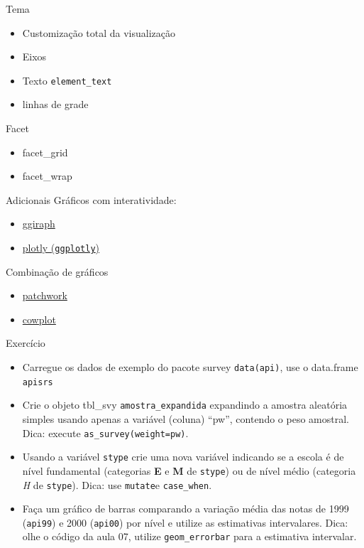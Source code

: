 \documentclass[
  9pt,
  ignorenonframetext,
]{beamer}
\begin{document}
\begin{frame}[fragile]{Tema}
\protect\hypertarget{tema}{}
\begin{itemize}
\item
  Customização total da visualização
\item
  Eixos
\item
  Texto \texttt{element\_text}
\item
  linhas de grade
\end{itemize}
\end{frame}

\begin{frame}{Facet}
\protect\hypertarget{facet}{}
\begin{itemize}
\item
  facet\_grid
\item
  facet\_wrap
\end{itemize}
\end{frame}

\begin{frame}[fragile]{Adicionais}
\protect\hypertarget{adicionais}{}
Gráficos com interatividade:

\begin{itemize}
\item
  \href{}{ggiraph}
\item
  \href{https://plotly-r.com/index.html}{plotly (\texttt{ggplotly})}
\end{itemize}

Combinação de gráficos

\begin{itemize}
\item
  \href{https://patchwork.data-imaginist.com/articles/patchwork.html}{patchwork}
\item
  \href{}{cowplot}
\end{itemize}
\end{frame}

\begin{frame}[fragile]{Exercício}
\protect\hypertarget{exercuxedcio}{}
\begin{itemize}
\item
  Carregue os dados de exemplo do pacote survey \texttt{data(api)}, use
  o data.frame \texttt{apisrs}
\item
  Crie o objeto tbl\_svy \texttt{amostra\_expandida} expandindo a
  amostra aleatória simples usando apenas a variável (coluna) ``pw'',
  contendo o peso amostral. Dica: execute
  \texttt{as\_survey(weight=pw)}.
\item
  Usando a variável \texttt{stype} crie uma nova variável indicando se a
  escola é de nível fundamental (categorias \textbf{E} e \textbf{M} de
  \texttt{stype}) ou de nível médio (categoria \emph{H} de
  \texttt{stype}). Dica: use \texttt{mutate}e \texttt{case\_when}.
\item
  Faça um gráfico de barras comparando a variação média das notas de
  1999 (\texttt{api99}) e 2000 (\texttt{api00}) por nível e utilize as
  estimativas intervalares. Dica: olhe o código da aula 07, utilize
  \texttt{geom\_errorbar} para a estimativa intervalar.
\end{itemize}
\end{frame}
\end{document}
